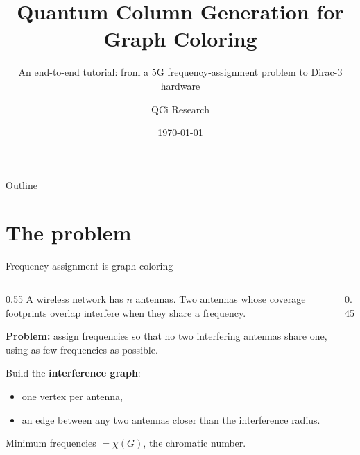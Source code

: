 \documentclass[aspectratio=169,11pt]{beamer}
\title[QCG End-to-End Tutorial]{Quantum Column Generation for Graph Coloring}
\subtitle{An end-to-end tutorial: from a 5G frequency-assignment problem to Dirac-3 hardware}
\author[QCi Research]{QCi Research}
\institute[QCi]{Quantum Computing Inc}
\date{\today}
\begin{document}
\begin{frame}[plain]
  \titlepage
\end{frame}

\begin{frame}{Outline}
  \tableofcontents
\end{frame}

\section{The problem}

\begin{frame}{Frequency assignment is graph coloring}
  \begin{columns}[T]
    \begin{column}{0.55\textwidth}
      A wireless network has $n$ antennas. Two antennas whose coverage
      footprints overlap \alert{interfere} when they share a frequency.

      \medskip
      \textbf{Problem:} assign frequencies so that no two interfering
      antennas share one, using as few frequencies as possible.

      \medskip
      Build the \textbf{interference graph}:
      \begin{itemize}
        \item one vertex per antenna,
        \item an edge between any two antennas closer than the interference radius.
      \end{itemize}
      Minimum frequencies $= \chi(G)$, the chromatic number.
    \end{column}
    \begin{column}{0.45\textwidth}
      \centering
    \end{column}
  \end{columns}
\end{frame}
\end{document}
